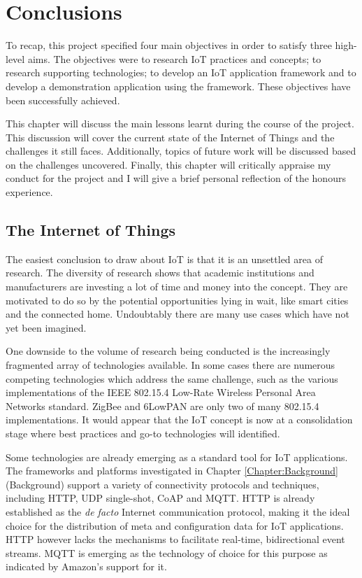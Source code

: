 \chapter{Conclusions}
  To recap, this project specified four main objectives in order to satisfy three high-level aims. The objectives were to research IoT practices and concepts; to research supporting technologies; to develop an IoT application framework and to develop a demonstration application using the framework. These objectives have been successfully achieved.

  This chapter will discuss the main lessons learnt during the course of the project. This discussion will cover the current state of the Internet of Things and the challenges it still faces. Additionally, topics of future work will be discussed based on the challenges uncovered. Finally, this chapter will critically appraise my conduct for the project and I will give a brief personal reflection of the honours experience.

  \section{The Internet of Things}
    The easiest conclusion to draw about IoT is that it is an unsettled area of research. The diversity of research shows that academic institutions and manufacturers are investing a lot of time and money into the concept. They are motivated to do so by the potential opportunities lying in wait, like smart cities and the connected home. Undoubtably there are many use cases which have not yet been imagined.

    One downside to the volume of research being conducted is the increasingly fragmented array of technologies available. In some cases there are numerous competing technologies which address the same challenge, such as the various implementations of the IEEE 802.15.4 Low-Rate Wireless Personal Area Networks standard. ZigBee and 6LowPAN are only two of many 802.15.4 implementations. It would appear that the IoT concept is now at a consolidation stage where best practices and go-to technologies will identified.

    Some technologies are already emerging as a standard tool for IoT applications. The frameworks and platforms investigated in Chapter \ref{Chapter:Background} (Background) support a variety of connectivity protocols and techniques, including HTTP, UDP single-shot, CoAP and MQTT. HTTP is already established as the \textit{de facto} Internet communication protocol, making it the ideal choice for the distribution of meta and configuration data for IoT applications. HTTP however lacks the mechanisms to facilitate real-time, bidirectional event streams. MQTT is emerging as the technology of choice for this purpose as indicated by Amazon's support for it.

